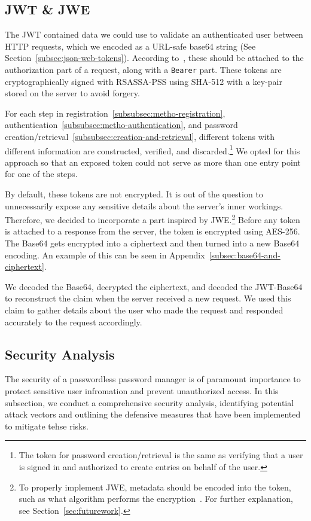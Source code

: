 \subsection{JWT \& JWE}\label{subsec:jwt}
The JWT contained data we could use to validate an authenticated user between
HTTP requests, which we encoded as a URL-safe base64 string
(See Section~\ref{subsec:json-web-tokens}).
According to~\cite{RFC7519}, these should be attached to the authorization part
of a request, along with a \texttt{Bearer} part.
These tokens are cryptographically signed with RSASSA-PSS using SHA-512 with a
key-pair stored on the server to avoid forgery.

For each step in registration~\ref{subsubsec:metho-registration},
authentication~\ref{subsubsec:metho-authentication}, and
password creation/retrieval~\ref{subsubsec:creation-and-retrieval}, different
tokens with different information are constructed, verified, and
discarded.\footnote{
  The token for password creation/retrieval is the same as verifying that a user
  is signed in and authorized to create entries on behalf of the user.
}
We opted for this approach so that an exposed token could not serve as more than
one entry point for one of the steps.

By default, these tokens are not encrypted.
It is out of the question to unnecessarily expose any sensitive details about
the server's inner workings.
Therefore, we decided to incorporate a part inspired by JWE.\footnote{
  To properly implement JWE, metadata should be encoded into the token, such as
  what algorithm performs the encryption~\cite{rfc7516}. For further
  explanation, see Section~\ref{sec:futurework}.
}
Before any token is attached to a response from the server, the token is
encrypted using AES-256\@.
The Base64 gets encrypted into a ciphertext and then turned into a new Base64
encoding.
An example of this can be seen in Appendix~\ref{subsec:base64-and-ciphertext}.

We decoded the Base64, decrypted the ciphertext, and decoded the JWT-Base64 to
reconstruct the claim when the server received a new request.
We used this claim to gather details about the user who made the request and
responded accurately to the request accordingly.


\subsection{Security Analysis}\label{subsec:security-analysis}
The security of a passwordless password manager is of paramount importance to
protect sensitive user infromation and prevent unauthorized access.
In this subsection, we conduct a comprehensive security analysis, identifying
  potential attack vectors and outlining the defensive measures that have
  been implemented to mitigate tehse risks.

